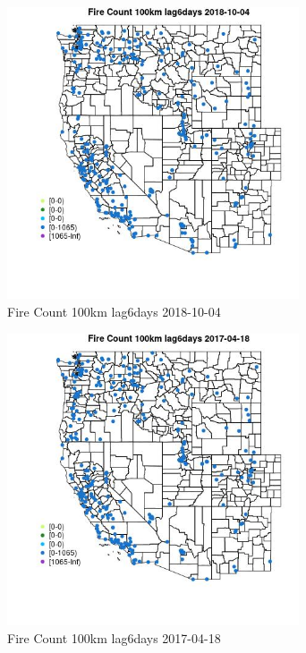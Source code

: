 \begin{figure} 
\centering  
\includegraphics[width=0.77\textwidth]{Code_Outputs/Report_ML_input_PM25_Step4_part_f_de_duplicated_aves_prioritize_24hr_obswNAs_MapObsFire_Count_100km_lag6days2018-10-04.jpg} 
\caption{\label{fig:Report_ML_input_PM25_Step4_part_f_de_duplicated_aves_prioritize_24hr_obswNAsMapObsFire_Count_100km_lag6days2018-10-04}Fire Count 100km lag6days 2018-10-04} 
\end{figure} 
 

\begin{figure} 
\centering  
\includegraphics[width=0.77\textwidth]{Code_Outputs/Report_ML_input_PM25_Step4_part_f_de_duplicated_aves_prioritize_24hr_obswNAs_MapObsFire_Count_100km_lag6days2017-04-18.jpg} 
\caption{\label{fig:Report_ML_input_PM25_Step4_part_f_de_duplicated_aves_prioritize_24hr_obswNAsMapObsFire_Count_100km_lag6days2017-04-18}Fire Count 100km lag6days 2017-04-18} 
\end{figure} 
 

